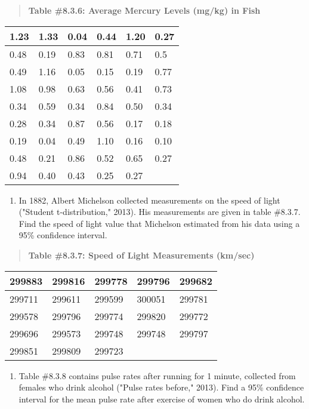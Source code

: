 \documentclass[]{book}
\providecommand{\tightlist}{%
  \setlength{\itemsep}{0pt}\setlength{\parskip}{0pt}}
\begin{document}
\begin{quote}
\textbf{Table \#8.3.6: Average Mercury Levels (mg/kg) in Fish}
\end{quote}

\begin{longtable}[]{@{}llllll@{}}
\toprule
1.23 & 1.33 & 0.04 & 0.44 & 1.20 & 0.27\tabularnewline
\midrule
\endhead
0.48 & 0.19 & 0.83 & 0.81 & 0.71 & 0.5\tabularnewline
0.49 & 1.16 & 0.05 & 0.15 & 0.19 & 0.77\tabularnewline
1.08 & 0.98 & 0.63 & 0.56 & 0.41 & 0.73\tabularnewline
0.34 & 0.59 & 0.34 & 0.84 & 0.50 & 0.34\tabularnewline
0.28 & 0.34 & 0.87 & 0.56 & 0.17 & 0.18\tabularnewline
0.19 & 0.04 & 0.49 & 1.10 & 0.16 & 0.10\tabularnewline
0.48 & 0.21 & 0.86 & 0.52 & 0.65 & 0.27\tabularnewline
0.94 & 0.40 & 0.43 & 0.25 & 0.27 &\tabularnewline
\bottomrule
\end{longtable}

\begin{enumerate}
\def\labelenumi{\arabic{enumi}.}
\setcounter{enumi}{3}
\tightlist
\item
  In 1882, Albert Michelson collected measurements on the speed of light ("Student t-distribution," 2013). His measurements are given in table \#8.3.7. Find the speed of light value that Michelson estimated from his data using a 95\% confidence interval.
\end{enumerate}

\begin{quote}
\textbf{Table \#8.3.7: Speed of Light Measurements (km/sec)}
\end{quote}

\begin{longtable}[]{@{}lllll@{}}
\toprule
299883 & 299816 & 299778 & 299796 & 299682\tabularnewline
\midrule
\endhead
299711 & 299611 & 299599 & 300051 & 299781\tabularnewline
299578 & 299796 & 299774 & 299820 & 299772\tabularnewline
299696 & 299573 & 299748 & 299748 & 299797\tabularnewline
299851 & 299809 & 299723 & &\tabularnewline
\bottomrule
\end{longtable}

\begin{enumerate}
\def\labelenumi{\arabic{enumi}.}
\setcounter{enumi}{4}
\tightlist
\item
  Table \#8.3.8 contains pulse rates after running for 1 minute, collected from females who drink alcohol ("Pulse rates before," 2013). Find a 95\% confidence interval for the mean pulse rate after exercise of women who do drink alcohol.
\end{enumerate}
\end{document}
